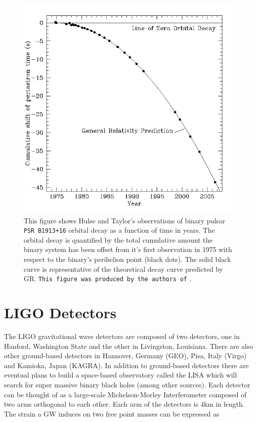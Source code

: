 \begin{figure}
    \centering
    \includegraphics[width=\linewidth]{figures/Hulse_taylor_pulsar.png}
    \caption[Hulse-Taylor binary pulsar decay.]{This figure shows Hulse 
    and Taylor's observations of binary pulsar \texttt{PSR B1913+16} 
    orbital decay as a function of time in years. The orbital decay is quantified by the total cumulative amount the binary system has been offset from it's first observation in 1975 with respect to the binary's perihelion point (black dots). The solid black curve is representative of the theoretical decay curve predicted by \ac{GR}. \texttt{This figure was produced by the authors of} \cite{1975ApJ...195L..51H}. }
    \label{fig:hulse_taylor_decay}
\end{figure}

\section{LIGO Detectors}

%
%

The \ac{LIGO} gravitational wave detectors are composed of 
two detectors, one in Hanford, Washington State and the 
other in Livingston, Louisiana. There are also other ground-based detectors 
in Hannover, Germany (GEO), Pisa, Italy (Virgo) and Kamioka, Japan 
(KAGRA). In addition to ground-based detectors there are eventual plans 
to build a space-based observatory called the \ac{LISA} which 
will search for super massive binary black holes (among other 
sources). Each detector can be thought 
of as a large-scale Michelson-Morley Interferometer composed 
of two arms orthogonal to each other. Each arm of 
the detectors is 4km in length. The strain a \ac{GW} induces on two free point masses 
can be expressed as 

